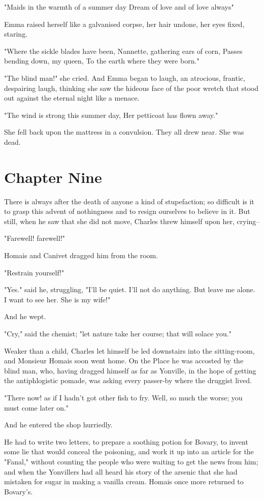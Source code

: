 \documentclass{tufte-book}
\begin{document}
"Maids in the warmth of a summer day Dream of love and of love always"

Emma raised herself like a galvanised corpse, her hair undone, her eyes
fixed, staring.

"Where the sickle blades have been, Nannette, gathering ears of corn,
Passes bending down, my queen, To the earth where they were born."

"The blind man!" she cried. And Emma began to laugh, an atrocious,
frantic, despairing laugh, thinking she saw the hideous face of the poor
wretch that stood out against the eternal night like a menace.

"The wind is strong this summer day, Her petticoat has flown away."

She fell back upon the mattress in a convulsion. They all drew near. She
was dead.



\chapter{Chapter Nine}

There is always after the death of anyone a kind of stupefaction;
so difficult is it to grasp this advent of nothingness and to resign
ourselves to believe in it. But still, when he saw that she did not
move, Charles threw himself upon her, crying--

"Farewell! farewell!"

Homais and Canivet dragged him from the room.

"Restrain yourself!"

"Yes." said he, struggling, "I'll be quiet. I'll not do anything. But
leave me alone. I want to see her. She is my wife!"

And he wept.

"Cry," said the chemist; "let nature take her course; that will solace
you."

Weaker than a child, Charles let himself be led downstairs into the
sitting-room, and Monsieur Homais soon went home. On the Place he
was accosted by the blind man, who, having dragged himself as far as
Yonville, in the hope of getting the antiphlogistic pomade, was asking
every passer-by where the druggist lived.

"There now! as if I hadn't got other fish to fry. Well, so much the
worse; you must come later on."

And he entered the shop hurriedly.

He had to write two letters, to prepare a soothing potion for Bovary, to
invent some lie that would conceal the poisoning, and work it up into an
article for the "Fanal," without counting the people who were waiting to
get the news from him; and when the Yonvillers had all heard his story
of the arsenic that she had mistaken for sugar in making a vanilla
cream. Homais once more returned to Bovary's.
\end{document}
